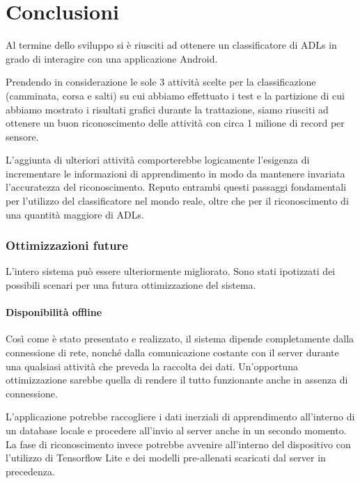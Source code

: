 \chapter{Conclusioni}
Al termine dello sviluppo si è riusciti ad ottenere un classificatore di ADLs in grado di interagire con una applicazione Android.

\vspace{5mm} %

Prendendo in considerazione le sole 3 attività scelte per la classificazione (camminata, corsa e salti) su cui abbiamo effettuato i test 
e la partizione di cui abbiamo mostrato i risultati grafici durante la trattazione, siamo riusciti ad ottenere un buon riconoscimento 
delle attività con circa 1 milione di record per sensore.

\vspace{5mm} %

L'aggiunta di ulteriori attività comporterebbe logicamente l'esigenza di incrementare le informazioni di apprendimento in modo da mantenere 
invariata l'accuratezza del riconoscimento. Reputo entrambi questi passaggi fondamentali per l'utilizzo del 
classificatore nel mondo reale, oltre che per il riconoscimento di una quantità maggiore di ADLs.

\subsection*{Ottimizzazioni future}
L'intero sistema può essere ulteriormente migliorato. 
Sono stati ipotizzati dei possibili scenari per una futura ottimizzazione del sistema.

\subsubsection{Disponibilità offline}
Così come è stato presentato e realizzato, il sistema dipende completamente dalla connessione di rete, nonché dalla comunicazione costante con il server 
durante una qualsiasi attività che preveda la raccolta dei dati.
Un'opportuna ottimizzazione sarebbe quella di rendere il tutto funzionante anche in assenza di connessione.

\vspace{5mm} %
L'applicazione potrebbe raccogliere i dati inerziali di apprendimento all'interno di un database locale e procedere all'invio al server 
anche in un secondo momento. La fase di riconoscimento invece potrebbe avvenire all'interno del dispositivo con 
l'utilizzo di Tensorflow Lite \cite{tensorflow_lite} e dei modelli pre-allenati scaricati dal server in precedenza.

